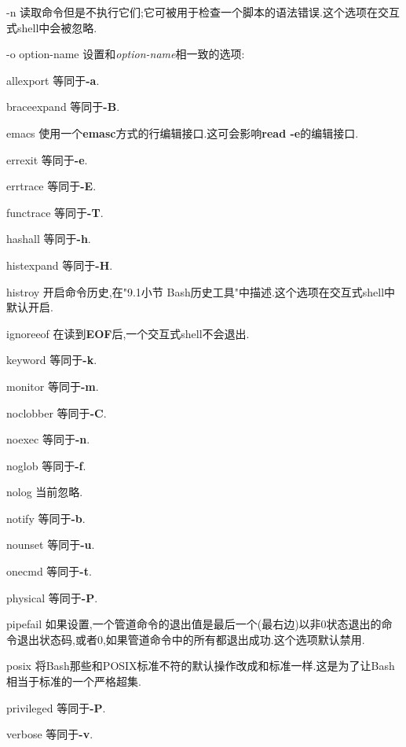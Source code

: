 \documentclass[draft,openany]{book}
\begin{document}
\begin{CJK}{UTF8}{gbsn}
\begin{basedescript}{\desclabelstyle{\nextlinelabel}\desclabelwidth{2.5em}}
    \item[-n] 读取命令但是不执行它们;它可被用于检查一个脚本的语法错误.这个选项在交互式shell中会被忽略.
    \item[-o option-name] 设置和\emph{option-name}相一致的选项:
        \begin{basedescript}{\desclabelstyle{\nextlinelabel}\desclabelwidth{2.5em}}
        \item[allexport] 等同于\textbf{-a}.
        \item[braceexpand] 等同于\textbf{-B}.
        \item[emacs] 使用一个\textbf{emasc}方式的行编辑接口.这可会影响\textbf{read -e}的编辑接口.
        \item[errexit] 等同于\textbf{-e}.
        \item[errtrace] 等同于\textbf{-E}.
        \item[functrace] 等同于\textbf{-T}.
        \item[hashall] 等同于\textbf{-h}.
        \item[histexpand] 等同于\textbf{-H}.
        \item[histroy] 开启命令历史,在"9.1小节 Bash历史工具"中描述.这个选项在交互式shell中默认开启.
        \item[ignoreeof] 在读到\textbf{EOF}后,一个交互式shell不会退出.
        \item[keyword] 等同于\textbf{-k}.
        \item[monitor] 等同于\textbf{-m}.
        \item[noclobber] 等同于\textbf{-C}.
        \item[noexec] 等同于\textbf{-n}.
        \item[noglob] 等同于\textbf{-f}.
        \item[nolog] 当前忽略.
        \item[notify] 等同于\textbf{-b}.
        \item[nounset] 等同于\textbf{-u}.
        \item[onecmd] 等同于\textbf{-t}.
        \item[physical] 等同于\textbf{-P}.
        \item[pipefail] 如果设置,一个管道命令的退出值是最后一个(最右边)以非0状态退出的命令退出状态码,或者0,如果管道命令中的所有都退出成功.这个选项默认禁用.
        \item[posix] 将Bash那些和POSIX标准不符的默认操作改成和标准一样.这是为了让Bash相当于标准的一个严格超集.
        \item[privileged] 等同于\textbf{-P}.
        \item[verbose] 等同于\textbf{-v}.

\end{basedescript}
\end{basedescript}
\end{CJK}
\end{document}
